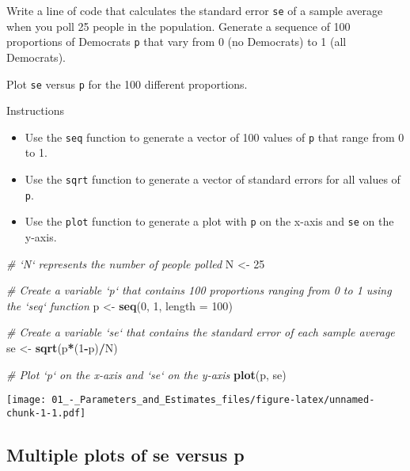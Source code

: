 \documentclass[]{article}
\newenvironment{Shaded}{\begin{snugshade}}{\end{snugshade}}
\newcommand{\KeywordTok}[1]{\textcolor[rgb]{0.13,0.29,0.53}{\textbf{#1}}}
\newcommand{\DataTypeTok}[1]{\textcolor[rgb]{0.13,0.29,0.53}{#1}}
\newcommand{\DecValTok}[1]{\textcolor[rgb]{0.00,0.00,0.81}{#1}}
\newcommand{\StringTok}[1]{\textcolor[rgb]{0.31,0.60,0.02}{#1}}
\newcommand{\CommentTok}[1]{\textcolor[rgb]{0.56,0.35,0.01}{\textit{#1}}}
\newcommand{\OperatorTok}[1]{\textcolor[rgb]{0.81,0.36,0.00}{\textbf{#1}}}
\newcommand{\NormalTok}[1]{#1}
\providecommand{\tightlist}{%
  \setlength{\itemsep}{0pt}\setlength{\parskip}{0pt}}
\begin{document}
Write a line of code that calculates the standard error \texttt{se} of a
sample average when you poll 25 people in the population. Generate a
sequence of 100 proportions of Democrats \texttt{p} that vary from 0 (no
Democrats) to 1 (all Democrats).

Plot \texttt{se} versus \texttt{p} for the 100 different proportions.

Instructions

\begin{itemize}
\tightlist
\item
  Use the \texttt{seq} function to generate a vector of 100 values of
  \texttt{p} that range from 0 to 1.
\item
  Use the \texttt{sqrt} function to generate a vector of standard errors
  for all values of \texttt{p}.
\item
  Use the \texttt{plot} function to generate a plot with \texttt{p} on
  the x-axis and \texttt{se} on the y-axis.
\end{itemize}

\begin{Shaded}
\begin{Highlighting}[]
\CommentTok{# `N` represents the number of people polled}
\NormalTok{N <-}\StringTok{ }\DecValTok{25}

\CommentTok{# Create a variable `p` that contains 100 proportions ranging from 0 to 1 using the `seq` function}
\NormalTok{p <-}\StringTok{ }\KeywordTok{seq}\NormalTok{(}\DecValTok{0}\NormalTok{, }\DecValTok{1}\NormalTok{, }\DataTypeTok{length =} \DecValTok{100}\NormalTok{)}

\CommentTok{# Create a variable `se` that contains the standard error of each sample average}
\NormalTok{se <-}\StringTok{ }\KeywordTok{sqrt}\NormalTok{(p}\OperatorTok{*}\NormalTok{(}\DecValTok{1}\OperatorTok{-}\NormalTok{p)}\OperatorTok{/}\NormalTok{N)}

\CommentTok{# Plot `p` on the x-axis and `se` on the y-axis}
\KeywordTok{plot}\NormalTok{(p, se)}
\end{Highlighting}
\end{Shaded}

\texttt{[image: 01\_-\_Parameters\_and\_Estimates\_files/figure-latex/unnamed-chunk-1-1.pdf]}

\subsection{\texorpdfstring{\textbf{Multiple plots of se versus
p}}{Multiple plots of se versus p}}\label{multiple-plots-of-se-versus-p}
\end{document}
